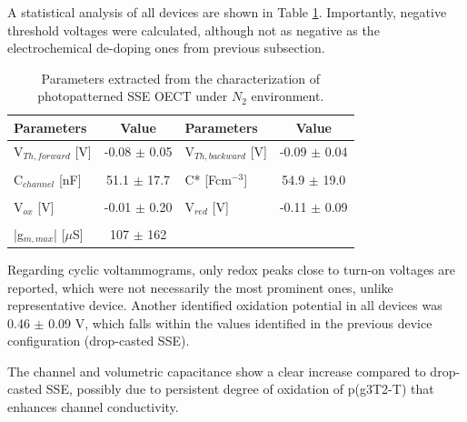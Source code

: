 A statistical analysis of all devices are shown in Table \ref{tab:photofom}. Importantly, negative threshold voltages were calculated, although not as negative as the electrochemical de-doping ones from previous subsection.

\begin{table}[ht]
\centering
\caption{Parameters extracted from the characterization of photopatterned SSE OECT under $N_{2}$ environment.}
\begin{tabular}{l|c||l|c}
Parameters & Value & Parameters & Value \\\hline \hline
V$_{Th,forward}$ [V] & -0.08 $\pm$ 0.05 & V$_{Th,backward}$ [V] & -0.09 $\pm$ 0.04\\
& & &\\[-1em]
C$_{channel}$ [nF] & 51.1 $\pm$ 17.7 & C* [Fcm$^{-3}$] & 54.9 $\pm$ 19.0 \\
& & &\\[-1em]
V$_{ox}$ [V] & -0.01 $\pm$ 0.20 & V$_{red}$ [V] & -0.11 $\pm$ 0.09  \\
& & &\\[-1em]
|g$_{m,max}$| [$\mu$S] & 107 $\pm$ 162 &  &\\\hline
\end{tabular}
\label{tab:photofom}
\end{table}

Regarding cyclic voltammograms, only redox peaks close to turn-on voltages are reported, which were not necessarily the most prominent ones, unlike representative device. Another identified oxidation potential in all devices was 0.46 $\pm$ 0.09 V, which falls within the values identified in the previous device configuration (drop-casted SSE).

The channel and volumetric capacitance show a clear increase compared to drop-casted SSE, possibly due to persistent degree of oxidation of p(g3T2-T) that enhances channel conductivity. 


